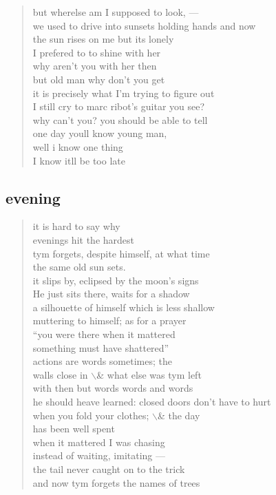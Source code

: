 \documentclass[11pt]{article}
\begin{document}
\begin{verse}
\vspace*{1em}
but wherelse am I supposed to look, ---\\
we used to drive into sunsets holding hands and now\\
the sun rises on me but its lonely\\
I prefered to to shine with her\\
why aren't you with her then\\
but old man why don't you get\\
it is precisely what I'm trying to figure out\\
I still cry to marc ribot's guitar you see?\\
why can't you? you should be able to tell\\
one day youll know young man,\\
well i know one thing\\
I know itll be too late\\
\end{verse}
\subsection{evening}
\label{sec:orgb912a1e}
\begin{verse}
it is hard to say why\\
evenings hit the hardest\\
tym forgets, despite himself, at what time\\
the same old sun sets.\\
it slips by, eclipsed by the moon's signs\\
He just sits there, waits for a shadow\\
a silhouette of himself which is less shallow\\
muttering to himself; as for a prayer\\
``you were there when it mattered\\
something must have shattered''\\
\vspace*{1em}
actions are words sometimes; the\\
walls close in $\backslash$& what else was tym left\\
with then but words words and words\\
he should heave learned: closed doors don't have to hurt\\
when you fold your clothes; $\backslash$& the day\\
has been well spent\\
\vspace*{1em}
when it mattered I was chasing\\
instead of waiting, imitating ---\\
the tail never caught on to the trick\\
and now tym forgets the names of trees\\
\end{verse}
\end{document}
